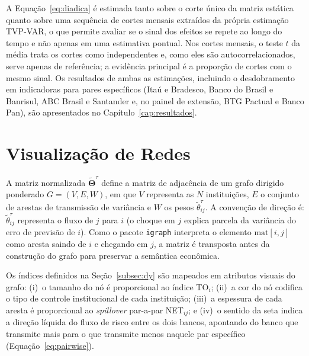 \documentclass[12pt, a4paper, oneside, english, brazil]{abntex2}
\begin{document}
A Equação~\eqref{eq:diadica} é estimada tanto sobre o corte único da matriz estática quanto
sobre uma sequência de cortes mensais extraídos da própria estimação TVP-VAR, o que permite
avaliar se o sinal dos efeitos se repete ao longo do tempo e não apenas em uma estimativa
pontual. Nos cortes mensais, o teste $t$ da média trata os cortes como independentes e, como eles são
autocorrelacionados, serve apenas de referência; a evidência principal é a proporção de cortes
com o mesmo sinal. Os resultados de ambas as estimações,
incluindo o desdobramento em indicadoras para pares específicos (Itaú e Bradesco, Banco do
Brasil e Banrisul, ABC Brasil e Santander e, no painel de extensão, BTG Pactual e Banco Pan),
são apresentados no Capítulo~\ref{cap:resultados}.

\section{Visualização de Redes}
\label{subsec:redes}

A matriz normalizada $\tilde{\boldsymbol{\Theta}}^{\tau}$ define a matriz de adjacência de um
grafo dirigido ponderado $G = (V, E, W)$, em que $V$ representa as  $N$ instituições, $E$
o conjunto de arestas de transmissão de variância e $W$ os pesos $\tilde{\theta}^{\tau}_{ij}$.
A convenção de direção é: $\tilde{\theta}^{\tau}_{ij}$ representa o fluxo de $j$ para $i$
(o choque em $j$ explica parcela da variância do erro de previsão de $i$). Como o pacote
\texttt{igraph} interpreta o elemento $\mathrm{mat}[i,j]$ como aresta saindo de $i$ e
chegando em $j$, a matriz é transposta antes da construção do grafo para preservar a
semântica econômica.

Os índices definidos na Seção~\ref{subsec:dy} são mapeados em atributos visuais do
grafo: (i)~o tamanho do nó é proporcional ao índice TO$_i$; (ii)~a cor do nó codifica o tipo de controle
institucional de cada instituição; (iii)~a espessura de cada aresta é
proporcional ao \textit{spillover} par-a-par NET$_{ij}$; e (iv)~o sentido da seta indica a
direção líquida do fluxo de risco entre os dois bancos, apontando do banco que
transmite mais para o que transmite menos naquele par específico
(Equação~\ref{eq:pairwise}).
\end{document}
